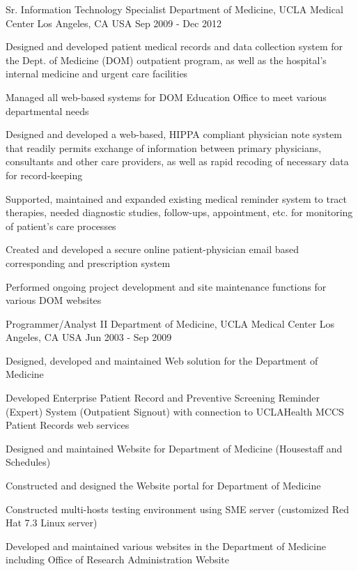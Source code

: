 \begin{cventries}
  \cventry
    {Sr. Information Technology Specialist} %
    {Department of Medicine, UCLA Medical Center} %
    {Los Angeles, CA USA} %
    {Sep 2009 - Dec 2012} %
    {
      \begin{cvitems} %
        \item {Designed and developed patient medical records and data collection system for the Dept. of Medicine (DOM) outpatient program, as well as the hospital's internal medicine and urgent care facilities}
        \item {Managed all web-based systems for DOM Education Office to meet various departmental needs}      
		 \item {Designed and developed a web-based, HIPPA compliant physician note system that readily permits exchange of information between primary physicians, consultants and other care providers, as well as rapid recoding of necessary data for record-keeping} 
		 \item{Supported, maintained and expanded existing medical reminder system to tract therapies, needed diagnostic studies, follow-ups, appointment, etc. for monitoring of patient's care processes}  
		 \item{Created and developed a secure online patient-physician email based corresponding and prescription system}
		 \item{Performed ongoing project development and site maintenance functions for various DOM websites}
      \end{cvitems}
    }

 \cventry
    {Programmer/Analyst II} %
    {Department of Medicine, UCLA Medical Center} %
    {Los Angeles, CA USA} %
    {Jun 2003 - Sep 2009} %
    {
      \begin{cvitems} %
        \item {Designed, developed and maintained Web solution for the Department of Medicine}
		 \item {Developed Enterprise Patient Record and Preventive Screening Reminder (Expert) System (Outpatient Signout) with connection to UCLAHealth MCCS Patient Records web services}
		  \item {Designed and maintained Website for Department of Medicine (Housestaff and Schedules)}
		  \item {Constructed and designed the Website portal for Department of Medicine}
		   \item {Constructed multi-hosts testing environment using SME server (customized Red Hat 7.3 Linux server)}
		   \item {Developed and maintained various websites in the Department of Medicine including Office of Research Administration Website}
      \end{cvitems}
    }


\end{cventries}
